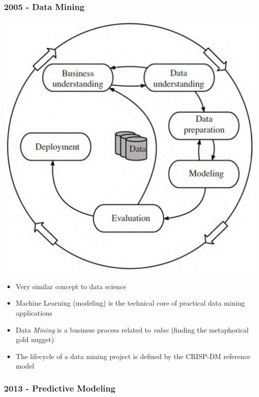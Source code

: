 \documentclass[a4paper]{article}
\begin{document}
			\newpage
			
			\subsubsection{2005 - Data Mining}
			
			\begin{minipage}[c]{0.3\textwidth}
				\centering
				\includegraphics[width=\textwidth]{img/sw01/data-mining.png}
			\end{minipage}
			\hfill
			\begin{minipage}[c]{0.6\textwidth}
				\begin{itemize}
					\item Very similar concept to data science
					\item Machine Learning (modeling) is the technical core of practical data mining applications
					\item Data \textit{Mining} is a business process related to \textit{value} (finding the metaphorical gold nugget)
					\item The lifecycle of a data mining project is defined by the CRISP-DM reference model
				\end{itemize}
			\end{minipage}
		
			\subsubsection{2013 - Predictive Modeling}
			
\end{document}

